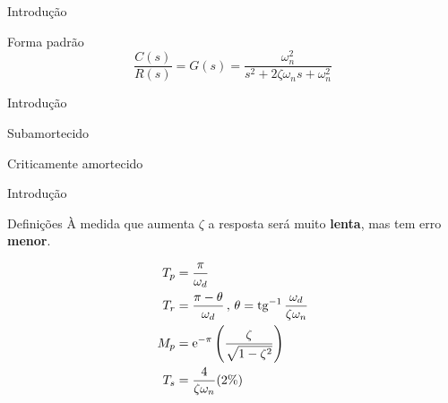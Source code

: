 \begin{frame}{Introdução}
\centering

\scalebox{0.8}{}

\vspace{1cm}

\begin{block}{Forma padrão}
	\[ \dfrac{C(s)}{R(s)}=G(s)=\dfrac{\omega_n^{2}}{s^{2}+2\zeta\omega_n s+\omega_n^{2}} \]
\end{block}
\end{frame}


\begin{frame}{Introdução}
\begin{minipage}[c]{0.45\linewidth}
	\centering
	
	\vspace{-1.6cm}
	\scalebox{0.8}{}
	
	Subamortecido
\end{minipage}
\hfill
\begin{minipage}[c]{0.45\linewidth}
	\centering
	
	\scalebox{0.8}{}
	
	Criticamente amortecido
\end{minipage}

\end{frame}


\begin{frame}{Introdução}
\begin{block}{Definições}
	À medida que aumenta $ \zeta $ a resposta será muito \textbf{lenta}, mas tem erro \textbf{menor}.
	
	\vspace{1cm}
	
	\begin{minipage}{0.45\linewidth}
		\centering
		
		\scalebox{0.7}{}
	\end{minipage}
	\hfill
	\begin{minipage}{0.45\linewidth}
		\begin{align*}
		T_p&=\dfrac{\pi}{\omega_d}\\
		T_r&=\dfrac{\pi-\theta}{\omega_d}\, , \, \theta=\operatorname{tg}^{-1}\dfrac{\omega_d}{\zeta\omega_n}\\
		M_p&=\text{e}^{-\pi}\left( \dfrac{\zeta}{\sqrt{1-\zeta^{2}}} \right)\\
		T_s&=\dfrac{4}{\zeta\omega_n}(2\%) 
		\end{align*}
	\end{minipage}
\end{block}
\end{frame}


